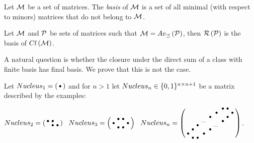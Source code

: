 \begin{defn}
Let $\mathcal{M}$ be a set of matrices. The \emph{basis} of $\mathcal{M}$ is a set of all minimal (with respect to minors) matrices that do not belong to $\mathcal{M}$.
\end{defn}

\begin{cor}
Let $\mathcal{M}$ and $\mathcal{P}$ be sets of matrices such that $\mathcal{M}=Av_{\preceq}\left(\mathcal{P}\right)$, then $\mathcal{R}\left(\mathcal{P}\right)$ is the basis of $Cl\left(\mathcal{M}\right)$.
\end{cor}

A natural question is whether the closure under the direct sum of a class with finite basis has final basis. We prove that this is not the case.

\begin{defn}
Let $Nucleus_1=\left(\begin{smallmatrix}\bullet\end{smallmatrix}\right)$ and for $n>1$ let $Nucleus_n\in\{0,1\}^{n\times n+1}$ be a matrix described by the examples:
\begin{center}
$Nucleus_2=\smm{\bullet&\bullet& \\ &\bullet&\bullet}\ \ 
Nucleus_3=\smm{ &\bullet&\bullet& \\\bullet& & &\bullet\\ &\bullet&\bullet& }\ \ 
Nucleus_n=\smm{ & & & & & &\bullet&\bullet& \\ & & & & &\bullet& & &\bullet\\ & & & &\bullet& & &\bullet& \\ & & &\dots& & &\bullet& & \\ & &\bullet& & &\dots& & & \\ &\bullet& & &\bullet& & & & \\\bullet& & &\bullet& & & & & \\ &\bullet&\bullet& & & & & & \\}$.
\end{center}
\end{defn}

